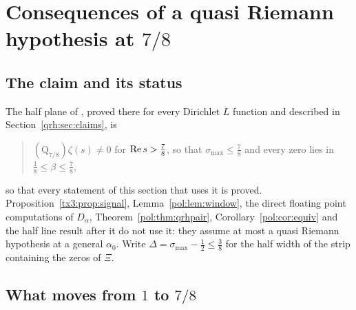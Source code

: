 \section{Consequences of a quasi Riemann hypothesis at $7/8$}\label{pol:sec:qrh}

\subsection{The claim and its status}

The half plane of \cite{OAI26a}, proved there for every Dirichlet $L$ function and described in Section~\ref{qrh:sec:claims}, is

\begin{quote}
$(\mathrm Q_{7/8})$\quad $\zeta(s)\ne0$ for $\operatorname{Re} s>\frac78$, so that $\sigma_{\max}\le\frac78$ and every zero lies in $\frac18\le\beta\le\frac78$,
\end{quote}

so that every statement of this section that uses it is proved. Proposition~\ref{tx3:prop:signal}, Lemma~\ref{pol:lem:window}, the direct floating point computations of $D_\alpha$, Theorem~\ref{pol:thm:qrhpair}, Corollary~\ref{pol:cor:equiv} and the half line result after it do not use it: they assume at most a quasi Riemann hypothesis at a general $\alpha_0$. Write $\Delta=\sigma_{\max}-\frac12\le\frac38$ for the half width of the strip containing the zeros of $\Xi$.

\subsection{What moves from $1$ to $7/8$}

